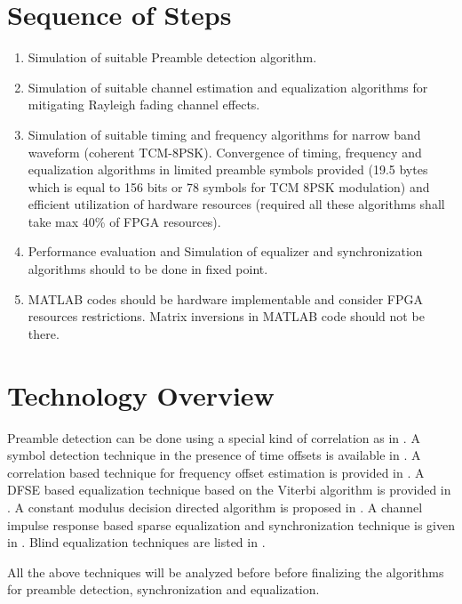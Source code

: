 \documentclass[journal,12pt,twocolumn]{IEEEtran}
\begin{document}
\section{Sequence of Steps}
\begin{enumerate}

\item Simulation of suitable Preamble detection algorithm.
\item Simulation of suitable channel estimation and equalization algorithms for mitigating Rayleigh fading channel effects.
\item  Simulation of suitable timing and frequency algorithms for narrow band waveform (coherent TCM-8PSK). Convergence of timing, frequency and equalization algorithms in limited preamble symbols provided (19.5 bytes which is equal to 156 bits or 78 symbols for  TCM 8PSK modulation) and efficient utilization of hardware resources (required all these algorithms shall take max 40\% of FPGA resources).
\item Performance evaluation and Simulation of equalizer and synchronization algorithms should to be done in fixed point.
\item MATLAB codes should be hardware implementable and consider FPGA resources restrictions. Matrix inversions in MATLAB code should not be there.

\end{enumerate}
\section{Technology Overview}
Preamble detection can be done using a special kind of correlation as in \cite{frame_offset}.  A symbol detection technique in the presence of time offsets is available in \cite{time_offset}.  A correlation based technique for frequency offset estimation is provided in \cite{freq_offset}. A DFSE based equalization technique based on the Viterbi algorithm is provided in \cite{dfse_viterbi}. A constant modulus decision directed algorithm is proposed in \cite{cmdd}. A channel impulse response based sparse equalization and synchronization technique is given in \cite{cir_sparse}.  Blind equalization techniques are listed in \cite{blind}.

All the above techniques will be analyzed before before finalizing the algorithms for preamble detection, synchronization and equalization.
\end{document}
